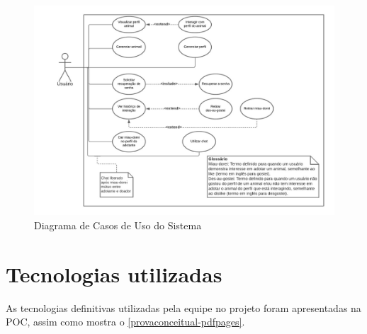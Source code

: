 \begin{figure}[!htbp]
    \centering
    \caption{\label{diagrama-casos}Diagrama de Casos de Uso do Sistema}
    \includegraphics[scale=0.4,angle=90]{imagens/CasosDeUsoPETINDER.jpeg}
\end{figure}

\section{Tecnologias utilizadas}
As tecnologias definitivas utilizadas pela equipe no projeto foram apresentadas na \ac{POC}, assim como mostra o \autoref{provaconceitual-pdfpages}.  

